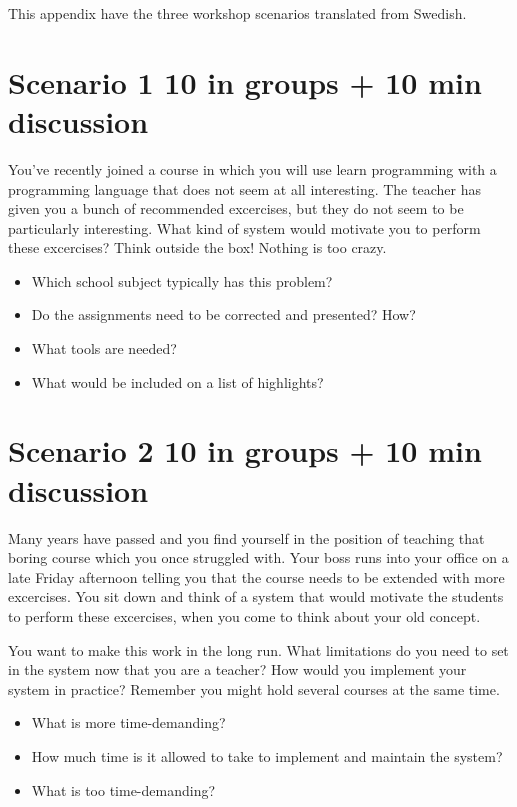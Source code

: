 \label{sec:workshop}
This appendix have the three workshop scenarios translated from Swedish.

\section*{Scenario 1 10 in groups + 10 min discussion}
You've recently joined a course in which you will use learn programming with a programming language that does not seem at all interesting. The teacher has given you a bunch of recommended excercises, but they do not seem to be particularly interesting. What kind of system would motivate you to perform these excercises? Think outside the box! Nothing is too crazy.

\begin{itemize}
\item Which school subject typically has this problem?
\item Do the assignments need to be corrected and presented? How?
\item What tools are needed?
\item What would be included on a list of highlights?
\end{itemize}

\section*{Scenario 2 10 in groups + 10 min discussion}
Many years have passed and you find yourself in the position of teaching that boring course which you once struggled with. Your boss runs into your office on a late Friday afternoon telling you that the course needs to be extended with more excercises. You sit down and think of a system that would motivate the students to perform these excercises, when you come to think about your old concept.

You want to make this work in the long run. What limitations do you need to set in the system now that you are a teacher? How would you implement your system in practice? Remember you might hold several courses at the same time.

\begin{itemize}
\item What is more time-demanding?
\item How much time is it allowed to take to implement and maintain the system?
\item What is too time-demanding?
\end{itemize}

